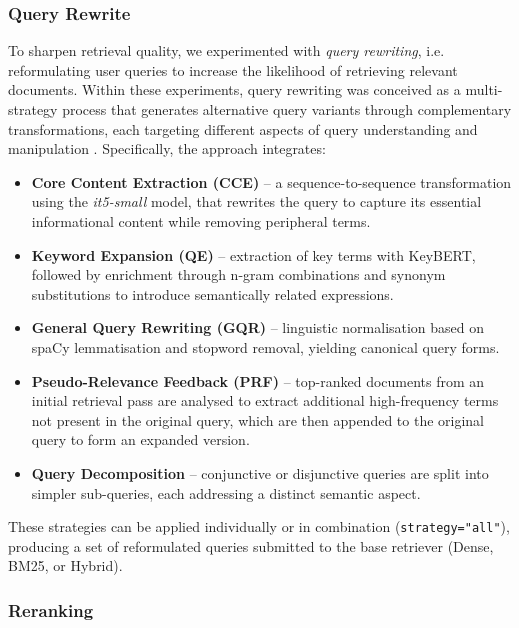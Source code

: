 \begin{spacing}{1.5}
\noindent \subsubsection*{\Large Query Rewrite}
To sharpen retrieval quality, we experimented with \textit{query rewriting}, i.e. reformulating user queries to increase the likelihood of retrieving relevant documents. Within these experiments, query rewriting was conceived as a multi-strategy process that generates alternative query variants through complementary transformations, each targeting different aspects of query understanding and manipulation \citep{li_dmqr-rag_2024}. Specifically, the approach integrates:
\begin{itemize}
      \item \textbf{Core Content Extraction (CCE)} -- a sequence-to-sequence transformation using the \textit{it5-small} model, that rewrites the query to capture its essential informational content while removing peripheral terms.
      \item \textbf{Keyword Expansion (QE)} -- extraction of key terms with KeyBERT, followed by enrichment through n-gram combinations and synonym substitutions to introduce semantically related expressions.
      \item \textbf{General Query Rewriting (GQR)} -- linguistic normalisation based on spaCy lemmatisation and stopword removal, yielding canonical query forms.
      \item \textbf{Pseudo-Relevance Feedback (PRF)} -- top-ranked documents from an initial retrieval pass are analysed to extract additional high-frequency terms not present in the original query, which are then appended to the original query to form an expanded version.
      \item \textbf{Query Decomposition} -- conjunctive or disjunctive queries are split into simpler sub-queries, each addressing a distinct semantic aspect.
\end{itemize}

These strategies can be applied individually or in combination (\texttt{strategy="all"}), producing a set of reformulated queries submitted to the base retriever (Dense, BM25, or Hybrid).\\


\noindent\subsubsection*{\Large Reranking}


\end{spacing}
